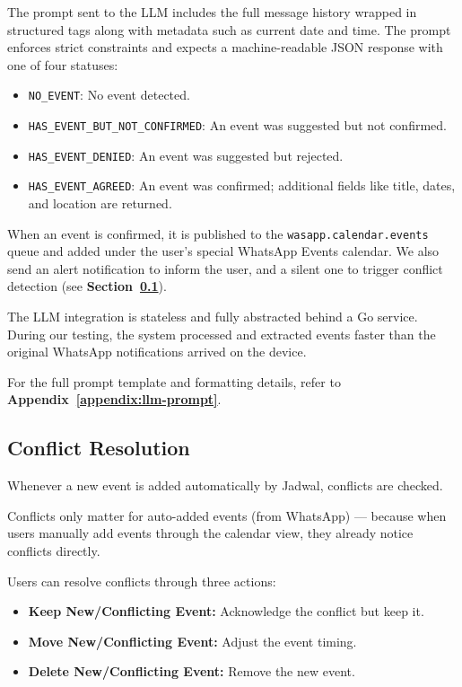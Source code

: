 The prompt sent to the LLM includes the full message history wrapped in structured tags along with metadata such as current date and time. The prompt enforces strict constraints and expects a machine-readable JSON response with one of four statuses:

\begin{itemize}
    \item \texttt{NO\_EVENT}: No event detected.
    \item \texttt{HAS\_EVENT\_BUT\_NOT\_CONFIRMED}: An event was suggested but not confirmed.
    \item \texttt{HAS\_EVENT\_DENIED}: An event was suggested but rejected.
    \item \texttt{HAS\_EVENT\_AGREED}: An event was confirmed; additional fields like title, dates, and location are returned.
\end{itemize}

When an event is confirmed, it is published to the \texttt{wasapp.calendar.events} queue and added under the user’s special WhatsApp Events calendar. We also send an alert notification to inform the user, and a silent one to trigger conflict detection (see \textbf{Section~\ref{subsec:conflict-resolution}}).

The LLM integration is stateless and fully abstracted behind a Go service. During our testing, the system processed and extracted events faster than the original WhatsApp notifications arrived on the device.

For the full prompt template and formatting details, refer to \textbf{Appendix~\ref{appendix:llm-prompt}}.

\subsection{Conflict Resolution} \label{subsec:conflict-resolution}

Whenever a new event is added automatically by Jadwal, conflicts are checked.

Conflicts only matter for auto-added events (from WhatsApp) — because when users manually add events through the calendar view, they already notice conflicts directly.

Users can resolve conflicts through three actions:
\begin{itemize}
    \item \textbf{Keep New/Conflicting Event:} Acknowledge the conflict but keep it.
    \item \textbf{Move New/Conflicting Event:} Adjust the event timing.
    \item \textbf{Delete New/Conflicting Event:} Remove the new event.
\end{itemize}

